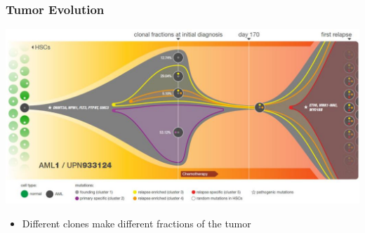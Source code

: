 \begin{frame}
\frametitle{Tumor Evolution}

\centering
  \includegraphics[width=\linewidth]{figures/clonal}
\begin{itemize}
\item Different clones make different fractions of the tumor 
\end{itemize}
\end{frame}


\def\mut#1#2{%
\begin{scope}[shift={#1}]
\node[thick,draw,fill=blue!70,circle, scale=3.5] (#2) {};
\end{scope}
}

\def\muta#1#2{%
\begin{scope}[shift={#1}]
\mut{(0,0)}{#2};
\draw[fill=white] (0,0) circle (.1);
\end{scope}
}

\def\mutb#1#2{%
\begin{scope}[shift={#1}]
\muta{(0,0)}{#2};
\node[fill,color=brown,star, star points=6,scale=0.75] at (45:0.3) {};
\end{scope}
}

\def\mutc#1#2{%
\begin{scope}[shift={#1}]
\muta{(0,0)}{#2};
\node[fill,color=green,regular polygon, regular polygon sides=3,scale=0.65] at (90:0.3) {};
\end{scope}
}

\def\mutd#1#2{%
\begin{scope}[shift={#1}]
\mutc{(0,0)}{#2};
\node[fill,color=red,regular polygon, regular polygon sides=4,scale=0.75] at (0:0.3) {};
\end{scope}
}

\def\mute#1#2{%
\begin{scope}[shift={#1}]
\mutd{(0,0)}{#2};
\node[draw,cross out, draw=pink, very thick,scale=.8] at (180:.3) {};
\end{scope}
}

